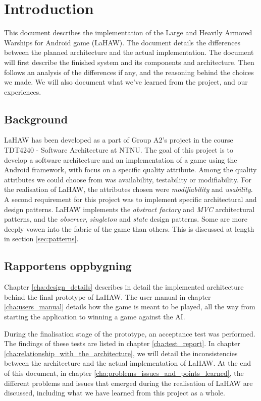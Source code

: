 \chapter{Introduction}

This document describes the implementation of the Large and Heavily Armored Warships for Android game (LaHAW). The document details the differences between the planned architecture and the actual implementation. The document will first describe the finished system and its components and architecture. Then follows an analysis of the differences if any, and the reasoning behind the choices we made. We will also document what we've learned from the project, and our experiences.

\section{Background}
LaHAW has been developed as a part of Group A2's project in the course TDT4240 - Software Architecture at NTNU. The goal of this project is to develop a software architecture and an implementation of a game using the Android framework, with focus on a specific quality attribute. Among the quality attributes we could choose from was availability, testability or modifiability. %
For the realisation of LaHAW, the attributes chosen were \emph{modifiability} and \emph{usability}.
A second requirement for this project was to implement specific architectural and design patterns. LaHAW implements the \emph{abstract factory} and \emph{MVC} architectural patterns, and the \emph{observer}, \emph{singleton} and \emph{state} design patterns. Some are more deeply vowen into the fabric of the game than others. This is discussed at length in section \ref{sec:patterns}.


\section{Rapportens oppbygning}

Chapter \ref{cha:design_details} describes in detail the implemented architecture behind the final prototype of LaHAW.
The user manual in chapter \ref{cha:users_manual} details how the game is meant to be played, all the way from starting the application to winning a game against the AI.

During the finalisation stage of the prototype, an acceptance test was performed. The findings of these tests are listed in chapter \ref{cha:test_report}.
In chapter \ref{cha:relationship_with_the_architecture}, we will detail the inconsistencies between the architecture and the actual implementation of LaHAW.
At the end of this document, in chapter \ref{cha:problems_issues_and_points_learned}, the different problems and issues that emerged during the realisation of LaHAW are discussed, including what we have learned from this project as a whole.